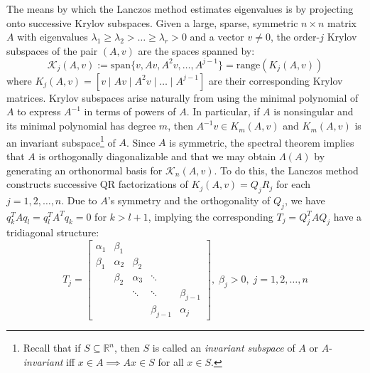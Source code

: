 \documentclass[10pt]{article}
\numberwithin{equation}{section}
\newcommand{\+}{%
	\raisebox{0.18ex}{\scaleobj{0.55}{+}}
}
\theoremstyle{definition}
\begin{document}
The means by which the Lanczos method estimates eigenvalues is by projecting onto successive Krylov subspaces. Given a large, sparse, symmetric $n \times n$ matrix $A$ with eigenvalues $\lambda_1 \geq \lambda_2 > \dots \geq \lambda_r > 0$ and a vector $v \neq 0$, the order-$j$ Krylov subspaces of the pair $(A, v)$ are the spaces spanned by: 
\begin{equation}
	\mathcal{K}_j(A, v) := \mathrm{span}\{ v, Av, A^2 v, \dots, A^{j-1} \} = \mathrm{range}(K_j(A, v))
\end{equation}
where $K_j(A, v) = [ v \mid Av \mid A^2 v \mid \dots \mid A^{j-1}]$ are their corresponding Krylov matrices. 
Krylov subspaces arise naturally from using the minimal polynomial of $A$ to express $A^{-1}$ in terms of powers of $A$. In particular, if $A$ is nonsingular and its minimal polynomial has degree $m$, then $A^{-1}v \in K_m(A, v)$ and $K_m(A, v)$ is an invariant subspace\footnote{Recall that if $S \subseteq \mathbb{R}^n$, then $S$ is called an \emph{invariant subspace} of $A$ or $A$-\emph{invariant} iff $x \in A \implies Ax \in S$ for all $x \in S$.} of $A$.
Since $A$ is symmetric, the spectral theorem implies that $A$ is orthogonally diagonalizable and that we may obtain $\Lambda(A)$ by generating an orthonormal basis for $\mathcal{K}_n(A, v)$. 
To do this, the Lanczos method constructs successive QR factorizations of $K_j(A,v) = Q_j R_j$ for each $j = 1, 2, \dots, n$.
Due to $A$'s symmetry and the orthogonality of $Q_j$, we have $q_k^T A q_l = q_l^T A^T q_k = 0$ for $k > l + 1$, implying the corresponding $T_j = Q_j^T A Q_j$ have a tridiagonal structure:
\begin{equation}
	T_j = \begin{bmatrix} 
	\alpha_1 & \beta_1 & & & \\
	\beta_1 & \alpha_2 & \beta_2 & & \\
	 & \beta_2 & \alpha_3 & \ddots & \\
	& & \ddots & \ddots & \beta_{j-1} \\
	& & & \beta_{j-1} & \alpha_{j} 
	\end{bmatrix}, \; \beta_j > 0, \; j = 1, 2, \dots, n
\end{equation}
\end{document}
